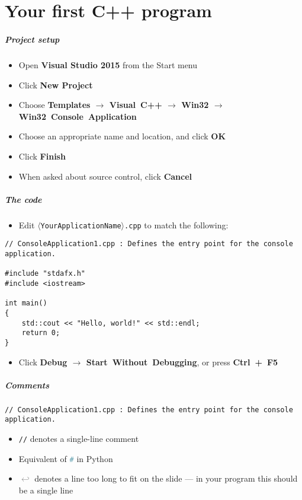 \part{Your first C++ program}
\frame{\partpage}

\begin{frame}
	\frametitle{Project setup}
	\begin{itemize}
		\item Open \textbf{Visual Studio 2015} from the Start menu
		\item Click \textbf{New Project}
		\item Choose \textbf{Templates $\to$ Visual~C++ $\to$ Win32 $\to$ Win32~Console~Application}
		\item Choose an appropriate name and location, and click \textbf{OK}
		\item Click \textbf{Finish}
		\item When asked about source control, click \textbf{Cancel}
	\end{itemize}
\end{frame}

\begin{frame}[fragile]
	\frametitle{The code}
	\begin{itemize}
		\item Edit \texttt{$\langle$YourApplicationName$\rangle$.cpp} to match the following:
	\end{itemize}
	\begin{lstlisting}
// ConsoleApplication1.cpp : Defines the entry point for the console application.

#include "stdafx.h"
#include <iostream>

int main()
{
    std::cout << "Hello, world!" << std::endl;
    return 0;
}
	\end{lstlisting}
	\begin{itemize}
		\item Click \textbf{Debug $\to$ Start~Without~Debugging}, or press \textbf{Ctrl~+~F5}
	\end{itemize}
\end{frame}

\begin{frame}[fragile]
	\frametitle{Comments}
	\begin{lstlisting}
// ConsoleApplication1.cpp : Defines the entry point for the console application.
	\end{lstlisting}
	\begin{itemize}
		\item \lstinline{//} denotes a single-line comment
		\item Equivalent of \lstinline[language=Python]{#} in Python
		\item \textcolor{Gray}{$\hookleftarrow$} denotes a line too long to fit on the slide ---
			in your program this should be a single line
	\end{itemize}
\end{frame}


